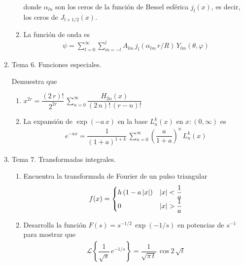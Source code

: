\begin{enumerate}
\begin{enumerate}[label=\roman*.]
donde $\alpha_{l n}$ son los ceros de la función de Bessel esférica $j_{l}(x)$, es decir, los ceros de $J_{l + 1/2}(x)$.
\item La función de onda es
\begin{align*}
\psi = \sum_{l=0}^{\infty} \sum_{m=-l}^{l} A_{l m} \, j_{l}(\alpha_{l m } \, r / R) \, Y_{l m}(\theta, \varphi)
\end{align*}
\end{enumerate}
\item Tema 6. Funciones especiales.
\par
Demuestra que
\begin{enumerate}[label=\roman*.]
\item $\displaystyle x^{2 r} = \dfrac{(2 \, r)!}{2^{2 r}} \, \sum_{n=0}^{\infty} \dfrac{H_{2 n}(x)}{(2 \, n)! \, (r - n)!}$
\item La expansión de $\exp(-a \, x)$ en la base $L_{n}^{k} (x)$ en $x:(0, \infty)$ es
\begin{align*}
e^{-a x} = \dfrac{1}{(1 + a)^{1 + k}} \, \sum_{n=0}^{\infty} \left( \dfrac{a}{1 + a} \right)^{n} \, L_{n}^{k}(x)
\end{align*}
\end{enumerate}
\item Tema 7. Transformadas integrales.
\par
\begin{enumerate}
\item Encuentra la transformada de Fourier de un pulso triangular
\begin{align*}
f(x) = \begin{cases}
h \, (1- a \, \abs{x}) & \abs{x} < \dfrac{1}{a} \\
0 & \abs{x} > \dfrac{1}{a}
\end{cases}
\end{align*}
\item Desarrolla la función $F(s) =  s^{-1/2} \, \exp(-1/s)$ en potencias de $s^{-1}$ para mostrar que
\begin{align*}
\mathscr{L} \left\{ \dfrac{1}{\sqrt{s}} \, e^{-1/s} \right\} = \dfrac{1}{\sqrt{\pi \, t}} \, \cos 2 \, \sqrt{t}
\end{align*}
\end{enumerate}
\end{enumerate}
